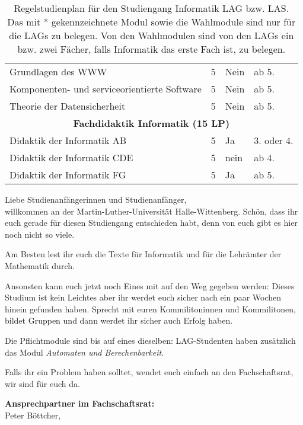 \begin{table}[tbp]
\begin{small}
\begin{tabularx}{\textwidth}{|b{}|X|X|l|}
			Grundlagen des WWW                               & 5 & Nein & ab 5. \\
			Komponenten- und serviceorientierte Software     & 5 & Nein & ab 5. \\
			Theorie der Datensicherheit                      & 5 & Nein & ab 5. \\
			\hline
			\multicolumn{4}{|c|}{\textbf{Fachdidaktik Informatik (15 LP)}}\\\hline
			Didaktik der Informatik AB  & 5 & Ja   & 3. oder 4. \\
			Didaktik der Informatik CDE & 5 & nein & ab 4. \\
			Didaktik der Informatik FG  & 5 & Ja   & ab 5. \\
			\hline
		\end{tabularx}
	\end{small}
	\caption{\label{plan-laI}Regelstudienplan für den Studiengang Informatik LAG bzw. LAS. Das mit * gekennzeichnete Modul sowie die Wahlmodule sind nur für die LAGs zu belegen. Von den Wahlmodulen sind von den LAGs ein bzw. zwei Fächer, falls Informatik das erste Fach ist, zu belegen.}
\end{table}

Liebe Studienanfängerinnen und Studienanfänger,\\
willkommen an der Martin-Luther-Universität Halle-Wittenberg.
Schön, dass ihr euch gerade für diesen Studiengang entschieden habt, denn von euch gibt es hier noch nicht so viele.

Am Besten lest ihr euch die Texte für Informatik und für die Lehrämter der Mathematik durch.

Ansonsten kann euch jetzt noch Eines mit auf den Weg gegeben werden:
Dieses Studium ist kein Leichtes aber ihr werdet euch sicher nach ein paar Wochen hinein gefunden haben.
Sprecht mit euren Kommilitoninnen und Kommilitonen, bildet Gruppen und dann werdet ihr sicher auch Erfolg haben.

Die Pflichtmodule sind bis auf eines dieselben: LAG-Studenten haben zusätzlich das Modul \textit{Automaten und Berechenbarkeit}.

Falls ihr ein Problem haben solltet, wendet euch einfach an den Fachschaftsrat, wir sind für euch da.

\textbf{Ansprechpartner im Fachschaftsrat:}\\
Peter Böttcher, \\

\newpage

